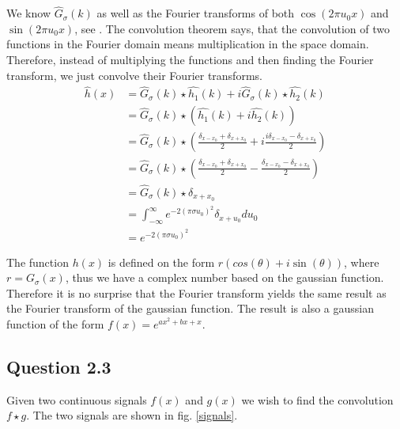 \documentclass[a4paper, 10pt, final]{article}
\begin{document}
We know $\hat{G}_{\sigma}(k)$ as well as the Fourier transforms of both
$\cos(2\pi u_0 x)$ and $\sin(2\pi u_0 x)$, see \citet[p.
557]{jahne-digital}. The convolution theorem says, that the convolution
of two functions in the Fourier domain means multiplication in the space
domain. Therefore, instead of multiplying the functions and then finding
the Fourier transform, we just convolve their Fourier transforms.
\begin{align}
    \hat{h}(x) & = \hat{G}_{\sigma}(k) \star \hat{h_1}(k) + i\hat{G}_{\sigma}(k) \star \hat{h_2}(k)\\
     & = \hat{G}_{\sigma}(k) \star (\hat{h_1}(k) + i\hat{h_2}(k))\\
     & = \hat{G}_{\sigma}(k) \star \left(\frac{\delta_{x - x_0} + \delta_{x + x_0}}{2} + i\frac{i\delta_{x - x_0} - \delta_{x + x_0}}{2}\right)\\
     & = \hat{G}_{\sigma}(k) \star \left(\frac{\delta_{x - x_0} + \delta_{x + x_0}}{2} - \frac{\delta_{x - x_0} - \delta_{x + x_0}}{2}\right)\\
     & = \hat{G}_{\sigma}(k) \star \delta_{x + x_0}\\
     & = \int_{-\infty}^{\infty}{e^{-2(\pi\sigma u_0)^2}\delta_{x + u_0}du_0}\\
     & = e^{-2(\pi\sigma u_0)^2}
\end{align}

The function $h(x)$ is defined on the form $r(cos(\theta) +
i\sin(\theta))$, where $r = G_{\sigma}(x)$, thus we have a complex
number based on the gaussian function. Therefore it is no surprise that
the Fourier transform yields the same result as the Fourier transform of
the gaussian function. The result is also a gaussian function of the
form $f(x) = e^{ax^2 + bx + x}$.

\subsection*{Question 2.3}
Given two continuous signals $f(x)$ and $g(x)$ we wish to find the
convolution $f \star g$. The two signals are shown in fig.
\ref{signals}.
\end{document}
